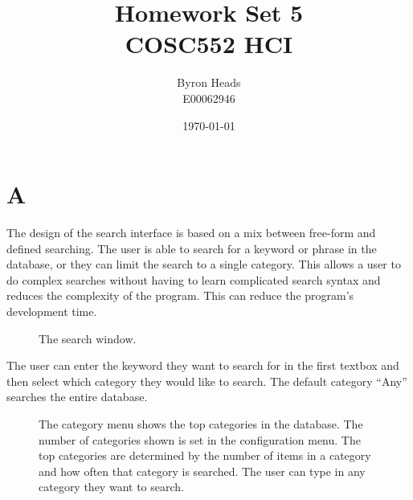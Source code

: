\documentclass[12pt]{report}
\title{Homework Set 5 \\
    COSC552 HCI}
\author{ Byron Heads \\
    E00062946 }
\date{\today}
\begin{document}
\maketitle

\chapter*{A}

The design of the search interface is based on a mix between free-form and defined searching.  The user is able to search for a keyword or phrase in the database, or they can limit the search to a single category.  This allows a user to do complex searches without having to learn complicated search syntax and reduces the complexity of the program.  This can reduce the program's development time.

\begin{figure}[h!]
\caption{The search window.}
\end{figure}

The user can enter the keyword they want to search for in the first textbox and then select which category they would like to search.  The default category ``Any'' searches the entire database.

\begin{figure}[h!]
\caption{The category menu shows the top categories in the database.  The number of categories shown is set in the configuration menu.  The top categories are determined by the number of items in a category and how often that category is searched.  The user can type in any category they want to search.}
\end{figure}
\end{document}

